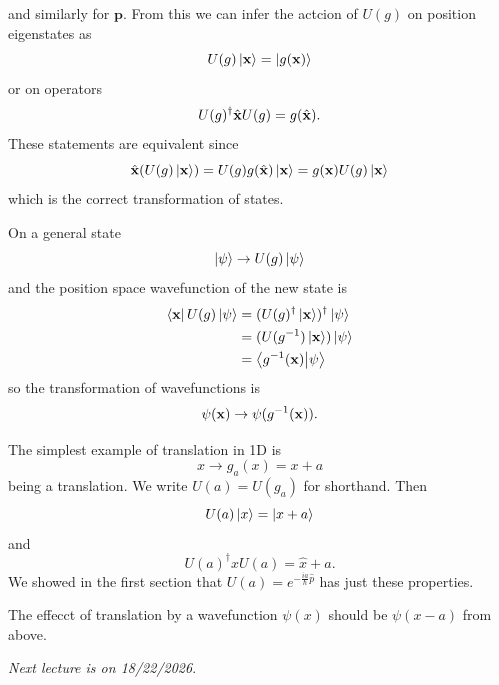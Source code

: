 \documentclass{article}
\begin{document}
and similarly for $ \mathbf p $. From this we can infer the actcion of $ U(g) $ on position eigenstates as
\[
	U(g) \ket {\mathbf{x}} = \ket{g(\mathbf{x})}
\]
or on operators
\[
U(g)^\dagger \hat{\mathbf x} U(g) = g(\hat {\mathbf{x}}).
\]
These statements are equivalent since
\[
  \hat {\mathbf{x}}(U(g)\ket{\mathbf{x}}) = U(g)g(\hat{\mathbf{x}})\ket {\mathbf{x}} = g(\mathbf{x})U(g)\ket {\mathbf{x}}
\]
which is the correct transformation of states.\par
On a general state
\[
  \ket\psi \to U(g)\ket \psi
\]
and the position space wavefunction of the new state is
\begin{align*}
	\bra{\mathbf{x}}U(g)\ket{\psi} &= (U(g)^\dagger \ket{\mathbf{x}})^\dagger \ket \psi \\
			       &= (U({g}^{-1})\ket {\mathbf{x}})\ket\psi \\
			       &= \bra{{g}^{-1}(\mathbf{x})}\ket{\psi}
\end{align*}
so the transformation of wavefunctions is
\[
  \psi(\mathbf{x}) \to \psi({g}^{-1}(\mathbf{x})).
\]
\begin{example}
  The simplest example of translation in 1D is
  \[
    x\to g_a(x) = x+a
  \]
  being a translation. We write $ U(a) = U(g_a) $ for shorthand. Then
  \[
	  U(a)\ket x = \ket{x+a}
  \]
  and 
  \[
    U(a)^\dagger \hat x U(a) = \hat x + a.
  \]
  We showed in the first section that $ U(a) = e^{-\frac {ia}\hbar \hat p} $ has just these properties.\par
  The effecct of translation by a wavefunction $ \psi(x) $ should be $ \psi(x-a) $ from above.
\end{example}
\smallskip\smallskip
\textit{Next lecture is on 18/22/2026}.
\end{document}
